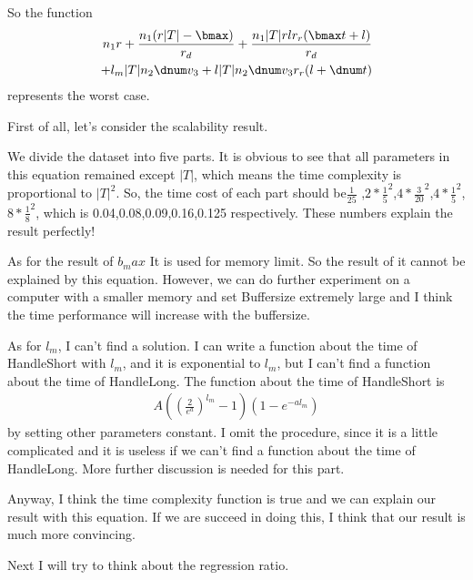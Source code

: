 So the function
\begin{align*}
  n_1 r
+ \frac{n_1 (r |T| - \bmax)}{r_d}
+ \frac{n_1 |T| r l r_r (\bmax t + l)}{r_d} \\
+ l_m |T| n_2 \dnum v_3
+ l |T| n_2 \dnum v_3 r_r (l + \dnum t)
\end{align*}
represents the worst case.






First of all, let's consider the scalability result.

We divide the dataset into five parts. It is obvious to see that all parameters in this equation remained except $|T|$, 
which means
the time complexity is proportional to $|T|^{2}$. 
So, the time cost of each part should be$\frac{1}{25}$ ,$2*\frac{1}{5}^{2}$,$4*\frac{3}{20}^{2}$,$4*\frac{1}{5}^{2}$,$8*\frac{1}{8}^{2}$, which is 0.04,0.08,0.09,0.16,0.125 
respectively. These numbers explain
the result perfectly!

As for the result of $b_max$
It is used for memory limit. So the result of it cannot be explained by this equation. 
However, we can do further experiment on a computer with a smaller memory and set Buffersize extremely large and 
I think the time performance will increase with the buffersize.


As for $l_m$, I can't find a solution. I can write a function about the time of HandleShort with $l_m$, and it is
exponential to $l_m$, but I can't find a function about the time of HandleLong. 
The function about the time of HandleShort is 
\begin{align*}
 A((\frac{2}{e^{a}})^{l_m}-1)(1-e^{-al_m})
\end{align*}
by setting other parameters constant. I omit the procedure, since it is 
a little complicated and it is useless if we can't find a function about the time of HandleLong.
More further discussion is needed for this part.

Anyway, I think the time complexity function is true and we can explain our result with this equation. 
If we are succeed in doing this, I think that our result is much more convincing.

Next I will try to think about the regression ratio.
